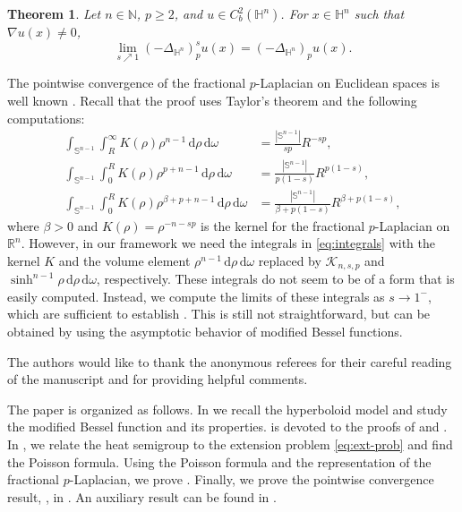\documentclass[11pt]{amsart}
\theoremstyle{plain}
\newtheorem{theorem}{Theorem}[section]
\theoremstyle{definition}
\numberwithin{equation}{section}
\begin{document}
\begin{theorem} \label{thm:convergence}
Let $n \in \mathbb{N}$, $p \geq 2$, and $u \in C^{2}_{b}(\mathbb{H}^{n})$. For $x \in \mathbb{H}^{n}$ such that $\nabla u(x) \neq 0$,
\begin{equation*}
\lim_{s \nearrow 1} (-\Delta_{\mathbb{H}^{n}})^{s}_{p} u(x) = (-\Delta_{\mathbb{H}^{n}})_{p} u(x).
\end{equation*}
\end{theorem}

The pointwise convergence of the fractional $p$-Laplacian on Euclidean spaces is well known \cite{BS22,DNPV12,IN10}. Recall that the proof uses Taylor's theorem and the following computations:
\begin{equation} \label{eq:integrals}
\begin{split}
\int_{\mathbb{S}^{n-1}} \int_{R}^{\infty} K(\rho)\rho^{n-1} \,\mathrm{d}\rho \,\mathrm{d}\omega &= \frac{|\mathbb{S}^{n-1}|}{sp} R^{-sp}, \\
\int_{\mathbb{S}^{n-1}} \int_{0}^{R} K(\rho)\rho^{p+n-1} \,\mathrm{d}\rho \,\mathrm{d}\omega &= \frac{|\mathbb{S}^{n-1}|}{p(1-s)} R^{p(1-s)}, \\
\int_{\mathbb{S}^{n-1}} \int_{0}^{R} K(\rho)\rho^{\beta+p+n-1} \,\mathrm{d}\rho \,\mathrm{d}\omega &= \frac{|\mathbb{S}^{n-1}|}{\beta +p(1-s)} R^{\beta+p(1-s)},
\end{split}
\end{equation}
where $\beta > 0$ and $K(\rho) = \rho^{-n-sp}$ is the kernel for the fractional $p$-Laplacian on $\mathbb{R}^{n}$. However, in our framework we need the integrals in \eqref{eq:integrals} with the kernel $K$ and the volume element $\rho^{n-1} \,\mathrm{d}\rho \,\mathrm{d}\omega$ replaced by $\mathcal{K}_{n,s,p}$ and $\sinh^{n-1} \rho \,\mathrm{d}\rho \,\mathrm{d}\omega$, respectively. These integrals do not seem to be of a form that is easily computed. Instead, we compute the limits of these integrals as $s \to 1^{-}$, which are sufficient to establish . This is still not straightforward, but can be obtained by using the asymptotic behavior of modified Bessel functions.

The authors would like to thank the anonymous referees for their careful reading of the manuscript and for providing helpful comments.

The paper is organized as follows. In  we recall the hyperboloid model and study the modified Bessel function and its properties.  is devoted to the proofs of  and . In , we relate the heat semigroup to the extension problem \eqref{eq:ext-prob} and find the Poisson formula. Using the Poisson formula and the representation of the fractional $p$-Laplacian, we prove . Finally, we prove the pointwise convergence result, , in . An auxiliary result can be found in .
\end{document}
